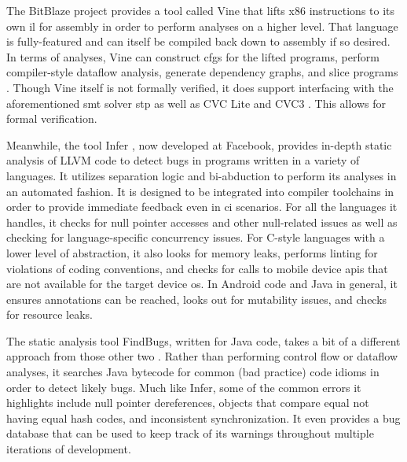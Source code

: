 The BitBlaze project \autocite{song2008bitblaze,BitBlazeWebSite}
provides a tool called Vine that lifts \gls{x86} instructions to its own \ac{il} for assembly
in order to perform analyses on a higher level.
That language is fully-featured and can itself be compiled back down to assembly
if so desired.
In terms of analyses, Vine can construct \acp{cfg} for the lifted programs,
perform compiler-style dataflow analysis, generate dependency graphs,
and slice programs \autocite{weiser1981slicing,tip1995survey}.
Though Vine itself is not formally verified,
it does support interfacing with the aforementioned \ac{smt} solver \ac{stp}
as well as CVC Lite \autocite{barrett2004cvcl} and CVC3 \autocite{barrett2007cvc3}.
This allows for formal verification.

Meanwhile, the tool Infer \autocite{calcagno2011infer}, now developed at Facebook,
provides in-depth static analysis of LLVM code to detect bugs in programs
written in a variety of languages.
It utilizes separation logic \autocite{reynolds2002separation}
and bi-abduction to perform its analyses in an automated fashion.
It is designed to be integrated into compiler toolchains
in order to provide immediate feedback even in \ac{ci} scenarios.
For all the languages it handles, it checks for null pointer accesses
and other null-related issues as well as checking for language-specific
concurrency issues.
For C-style languages with a lower level of abstraction,
it also looks for memory leaks, performs linting for violations of coding conventions,
and checks for calls to mobile device \acp{api} that are not available
for the target device \ac{os}.
In Android code and Java in general, it ensures annotations can be reached,
looks out for mutability issues, and checks for resource leaks.

The static analysis tool FindBugs, written for Java code,
takes a bit of a different approach from those other two
\autocite{hovemeyer2004findbugs}.
Rather than performing control flow or dataflow analyses,
it searches Java bytecode for common (bad practice) code idioms
in order to detect likely bugs. Much like Infer,
some of the common errors it highlights include null pointer dereferences,
objects that compare equal not having equal hash codes,
and inconsistent synchronization.
It even provides a bug database that can be used to keep track of its warnings
throughout multiple iterations of development.

